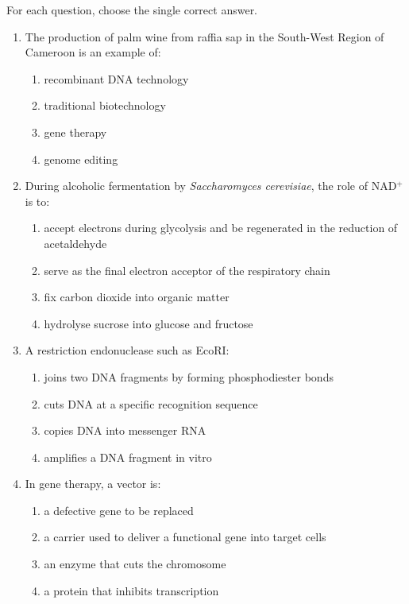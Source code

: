 \documentclass[11pt]{article}
\begin{document}
\begin{exercice}
For each question, choose the single correct answer.
\begin{enumerate}
\item The production of palm wine from raffia sap in the South-West Region of Cameroon is an example of:
\begin{enumerate}
\item recombinant DNA technology
\item traditional biotechnology
\item gene therapy
\item genome editing
\end{enumerate}
\item During alcoholic fermentation by \emph{Saccharomyces cerevisiae}, the role of NAD$^+$ is to:
\begin{enumerate}
\item accept electrons during glycolysis and be regenerated in the reduction of acetaldehyde
\item serve as the final electron acceptor of the respiratory chain
\item fix carbon dioxide into organic matter
\item hydrolyse sucrose into glucose and fructose
\end{enumerate}
\item A restriction endonuclease such as EcoRI:
\begin{enumerate}
\item joins two DNA fragments by forming phosphodiester bonds
\item cuts DNA at a specific recognition sequence
\item copies DNA into messenger RNA
\item amplifies a DNA fragment in vitro
\end{enumerate}
\item In gene therapy, a vector is:
\begin{enumerate}
\item a defective gene to be replaced
\item a carrier used to deliver a functional gene into target cells
\item an enzyme that cuts the chromosome
\item a protein that inhibits transcription
\end{enumerate}
\end{enumerate}
\end{exercice}
\end{document}
